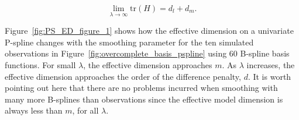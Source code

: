 \documentclass[12pt]{article}
\theoremstyle{definition}
\begin{document}
 \[
\lim_{\lambda \rightarrow \infty  } \mbox{tr}\left(H\right) = d_l + d_m.
 \]
%
%
%
%
%
%

Figure~\ref{fig:PS_ED_figure_1} shows how the effective dimension on a univariate P-spline changes with the smoothing parameter for the ten simulated observations in Figure~\ref{fig:overcomplete_basis_pspline} using 60 B-spline basis functions. For small $\lambda$, the effective dimension approaches $m$. As $\lambda$ increases, the effective dimension approaches the order of the difference penalty, $d$. It is worth pointing out here that there are no problems incurred when smoothing with many more B-splines than observations since the effective model dimension is always less than $m$, for all $\lambda$. 
\end{document}
